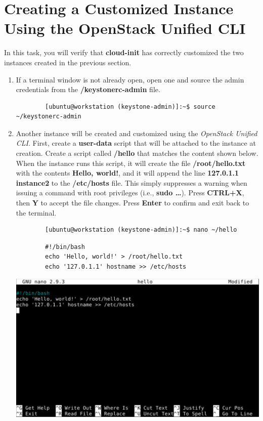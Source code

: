 \documentclass[letterpaper, 12pt]{article}
\begin{document}
\section{Creating a Customized Instance Using the OpenStack Unified CLI}
\label{sec:creating_a_customized_instance_using_the_openstack_unified_cli}
In this task, you will verify that \textbf{cloud-init} has correctly customized the two instances created in the previous section.

\begin{enumerate}
    \item If a terminal window is not already open, open one and source the admin credentials from the \textbf{\texttildemid/keystonerc-admin} file.
    \begin{lstlisting}
        [ubuntu@workstation (keystone-admin)]:~$ source ~/keystonerc-admin
    \end{lstlisting}

    \item Another instance will be created and customized using the \textit{OpenStack Unified CLI}.
    First, create a \textbf{user-data} script that will be attached to the instance at creation.
    Create a script called \textbf{\texttildemid/hello} that matches the content shown below.
    When the instance runs this script, it will create the file \textbf{/root/hello.txt} with the contents \textbf{Hello, world!}, and it will append the line \textbf{127.0.1.1 instance2} to the \textbf{/etc/hosts} file.
    This simply suppresses a warning when issuing a command with root privileges (i.e., \textbf{sudo …}).
    Press \textbf{CTRL+X}, then \textbf{Y} to accept the file changes.
    Press \textbf{Enter} to confirm and exit back to the terminal.
    \begin{lstlisting}
        [ubuntu@workstation (keystone-admin)]:~$ nano ~/hello
    \end{lstlisting}
    \begin{lstlisting}
        #!/bin/bash
        echo 'Hello, world!' > /root/hello.txt
        echo '127.0.1.1' hostname >> /etc/hosts
    \end{lstlisting}

    \begin{center}
        \includegraphics[width=\linewidth]{images/part3/step2.png}
    \end{center}


\end{enumerate}
\end{document}
